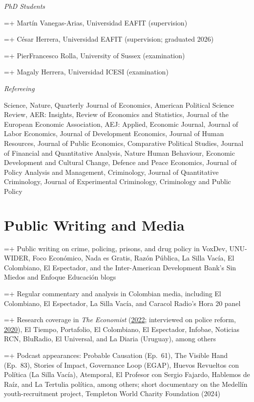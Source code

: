 \documentclass[10pt]{article}
\newlength{\datecolwidth}
\newlength{\gapwidth}
\newcommand{\cventry}[2]{%
  \par\hangindent=\dimexpr\datecolwidth+\gapwidth\relax\hangafter=1
  \noindent\makebox[\datecolwidth][l]{#1}\hspace{\gapwidth}#2\par\vspace{0.1ex}}
\newcommand{\cvsub}[1]{\par\vspace{0.5ex}\textit{#1}\par\nopagebreak\vspace{0.3ex}\nopagebreak}
\begin{document}
\cvsub{PhD Students}
\cventry{2023--}{Mart\'{i}n Vanegas-Arias, Universidad EAFIT (supervision)}
\cventry{2020--26}{C\'{e}sar Herrera, Universidad EAFIT (supervision; graduated 2026)}
\cventry{2022}{PierFrancesco Rolla, University of Sussex (examination)}
\cventry{2021}{Magaly Herrera, Universidad ICESI (examination)}

\cvsub{Refereeing}
Science, Nature, Quarterly Journal of Economics, American Political Science Review, AER: Insights, Review of Economics and Statistics, Journal of the European Economic Association, AEJ: Applied, Economic Journal, Journal of Labor Economics, Journal of Development Economics, Journal of Human Resources, Journal of Public Economics, Comparative Political Studies, Journal of Financial and Quantitative Analysis, Nature Human Behaviour, Economic Development and Cultural Change, Defence and Peace Economics, Journal of Policy Analysis and Management, Criminology, Journal of Quantitative Criminology, Journal of Experimental Criminology, Criminology and Public Policy

\section*{Public Writing and Media}

\cventry{2015--}{Public writing on crime, policing, prisons, and drug policy in VoxDev, UNU-WIDER, Foco Econ\'{o}mico, Nada es Gratis, Raz\'{o}n P\'{u}blica, La Silla Vac\'{i}a, El Colombiano, El Espectador, and the Inter-American Development Bank's Sin Miedos and Enfoque Educaci\'{o}n blogs}
\cventry{}{Regular commentary and analysis in Colombian media, including El Colombiano, El Espectador, La Silla Vac\'{i}a, and Caracol Radio's Hora 20 panel}
\cventry{}{Research coverage in \textit{The Economist} (\href{https://www.economist.com/the-americas/2022/05/19/medellin-is-an-example-of-what-colombia-could-be}{2022}; interviewed on police reform, \href{https://www.economist.com/the-americas/2020/09/19/why-colombias-militarised-police-need-reform}{2020}), El Tiempo, Portafolio, El Colombiano, El Espectador, Infobae, Noticias RCN, BluRadio, El Universal, and La Diaria (Uruguay), among others}
\cventry{}{Podcast appearances: Probable Causation (Ep.\ 61), The Visible Hand (Ep.\ 83), Stories of Impact, Governance Loop (EGAP), Huevos Revueltos con Pol\'{i}tica (La Silla Vac\'{i}a), Atemporal, El Profesor con Sergio Fajardo, Hablemos de Ra\'{i}z, and La Tertulia pol\'{i}tica, among others; short documentary on the Medell\'{i}n youth-recruitment project, Templeton World Charity Foundation (2024)}
\end{document}
